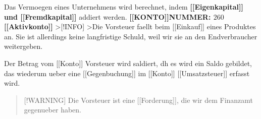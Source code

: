 Das Vermoegen eines Unternehmens wird berechnet, indem
\textbf{{[}{[}Eigenkapital{]}{]} und {[}{[}Fremdkapital{]}{]}} addiert
werden. \textbf{{[}{[}KONTO{]}{]}NUMMER: \(260\)}
\textbf{{[}{[}Aktivkonto{]}{]}} \textgreater{[}!INFO{]} \textgreater Die
Vorsteuer faellt beim {[}{[}Einkauf{]}{]} eines Produktes an. Sie ist
allerdings keine langfristige Schuld, weil wir sie an den Endverbraucher
weitergeben.

Der Betrag vom {[}{[}Konto{]}{]} Vorsteuer wird saldiert, dh es wird ein
Saldo gebildet, das wiederum ueber eine {[}{[}Gegenbuchung{]}{]} im
{[}{[}Konto{]}{]} {[}{[}Umsatzsteuer{]}{]} erfasst wird.

\begin{quote}
{[}!WARNING{]} Die Vorsteuer ist eine {[}{[}Forderung{]}{]}, die wir dem
Finanzamt gegenueber haben.
\end{quote}
